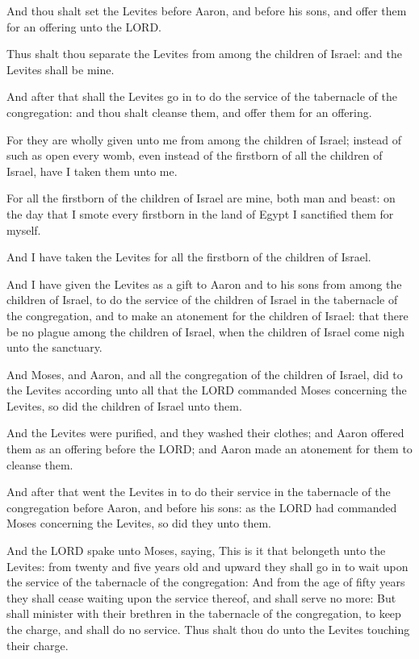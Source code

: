 \Verse And thou shalt set the Levites before Aaron, and before his sons,
and offer them for an offering unto the LORD.

\Verse Thus shalt thou separate the Levites from among the children of
Israel: and the Levites shall be mine.

\Verse And after that shall the Levites go in to do the service of the
tabernacle of the congregation: and thou shalt cleanse them, and offer
them for an offering.

\Verse For they are wholly given unto me from among the children of
Israel; instead of such as open every womb, even instead of the
firstborn of all the children of Israel, have I taken them unto me.

\Verse For all the firstborn of the children of Israel are mine, both
man and beast: on the day that I smote every firstborn in the land of
Egypt I sanctified them for myself.

\Verse And I have taken the Levites for all the firstborn of the
children of Israel.

\Verse And I have given the Levites as a gift to Aaron and to his sons
from among the children of Israel, to do the service of the children
of Israel in the tabernacle of the congregation, and to make an
atonement for the children of Israel: that there be no plague among
the children of Israel, when the children of Israel come nigh unto the
sanctuary.

\Verse And Moses, and Aaron, and all the congregation of the children of
Israel, did to the Levites according unto all that the LORD commanded
Moses concerning the Levites, so did the children of Israel unto them.

\Verse And the Levites were purified, and they washed their clothes; and
Aaron offered them as an offering before the LORD; and Aaron made an
atonement for them to cleanse them.

\Verse And after that went the Levites in to do their service in the
tabernacle of the congregation before Aaron, and before his sons: as
the LORD had commanded Moses concerning the Levites, so did they unto
them.

\Verse And the LORD spake unto Moses, saying, \Verse This is it that
belongeth unto the Levites: from twenty and five years old and upward
they shall go in to wait upon the service of the tabernacle of the
congregation: \Verse And from the age of fifty years they shall cease
waiting upon the service thereof, and shall serve no more: \Verse But
shall minister with their brethren in the tabernacle of the
congregation, to keep the charge, and shall do no service. Thus shalt
thou do unto the Levites touching their charge.


